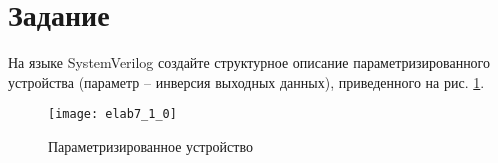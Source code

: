 





\tableofcontents
\listoffigures
\lstlistoflistings
\newpage

\section{Задание}

На языке SystemVerilog создайте структурное описание параметризированного устройства (параметр  -- инверсия выходных данных), приведенного на рис. \ref{fig:elab7_1_0}.

\begin{figure}[H]
\begin{center}
	\texttt{[image: elab7\_1\_0]}
	\caption{Параметризированное устройство}
	\label{fig:elab7_1_0}
\end{center}
\end{figure}
\vspace{-0.5cm}

